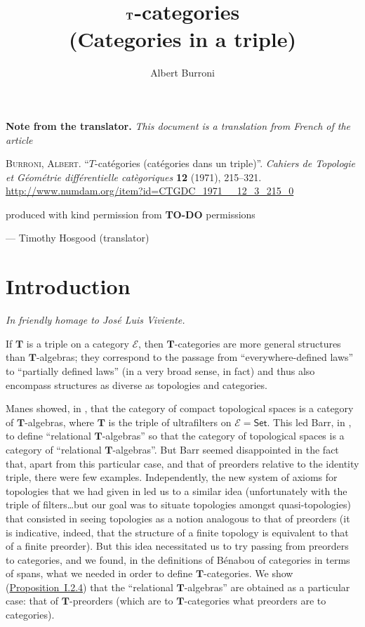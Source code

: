 \documentclass[fleqn]{article}
\title{$\TT$-categories\\(Categories in a triple)}
\author{Albert Burroni}
\date{}
\newcommand{\origcit}{%
  \textsc{Burroni, Albert.}
  ``$T$-catégories (catégories dans un triple)''.
  \emph{Cahiers de Topologie et Géométrie différentielle catègoriques} \textbf{12} (1971), 215--321.
  {\url{http://www.numdam.org/item?id=CTGDC_1971__12_3_215_0}}
}
\newenvironment{translator}[1]
  {\phantomsection\par\medskip\noindent\small\textbf{#1.}\itshape}
  {\par\medskip}
\newcommand{\oldpage}[1]{\marginpar{\footnotesize$\Big\vert$ \textit{p.~#1}}}
\newcommand{\todo}{{\color{purple}\textbf{TO-DO }}}
\newcommand{\TT}{\mathbf{T}}
\newcommand{\cat}[1]{\mathcal{#1}}
\newcommand{\Cat}[1]{\mathsf{#1}}
\begin{document}
\maketitle

\begin{translator}{Note from the translator}
  This document is a translation from French of the article

  \medskip
  {\normalfont\origcit}

  \medskip
  {\noindent}produced with kind permission from \todo{permissions}

  \hfill--- Timothy Hosgood (translator)
\end{translator}



\section*{Introduction}

\hfill\emph{In friendly homage to José Luis Viviente.}

\bigskip

\oldpage{215}
If $\TT$ is a triple on a category $\cat{E}$, then $\TT$-categories are more general structures than $\TT$-algebras; they correspond to the passage from ``everywhere-defined laws'' to ``partially defined laws'' (in a very broad sense, in fact) and thus also encompass structures as diverse as topologies and categories.

Manes showed, in \cite{Ma}, that the category of compact topological spaces is a category of $\TT$-algebras, where $\TT$ is the triple of ultrafilters on $\cat{E}=\Cat{Set}$.
This led Barr, in \cite{Ba}, to define ``relational $\TT$-algebras'' so that the category of topological spaces is a category of ``relational $\TT$-algebras''.
But Barr seemed disappointed in the fact that, apart from this particular case, and that of preorders relative to the identity triple, there were few examples.
Independently, the new system of axioms for topologies that we had given in \cite{Bu} led us to a similar idea (unfortunately with the triple of filters\ldots but our goal was to situate topologies amongst quasi-topologies) that consisted in seeing topologies as a notion analogous to that of preorders (it is indicative, indeed, that the structure of a finite topology is equivalent to that of a finite preorder).
But this idea necessitated us to try passing from preorders to categories, and we found, in the definitions of Bénabou \cite{Be} of categories in terms of spans, what we needed in order to define $\TT$-categories.
We show (\hyperref[proposition:i.2.4]{Proposition~I.2.4}) that the ``relational $\TT$-algebras'' are obtained as a particular case: that of $\TT$-preorders (which are to $\TT$-categories what preorders are to categories).
\end{document}
